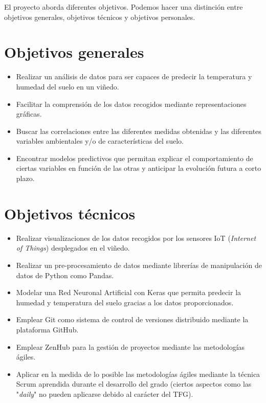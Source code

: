 
El proyecto aborda diferentes objetivos. Podemos hacer una distinción entre 
objetivos generales, objetivos técnicos y objetivos personales.

\section{Objetivos generales}
\begin{itemize}
    \item Realizar un análisis de datos para ser capaces de predecir la temperatura
        y humedad del suelo en un viñedo.
    \item Facilitar la comprensión de los datos recogidos mediante representaciones
        gráficas.
    \item Buscar las correlaciones entre las diferentes medidas obtenidas y las 
        diferentes variables ambientales y/o de características del suelo.
    \item Encontrar modelos predictivos que permitan explicar el comportamiento
        de ciertas variables en función de las otras y anticipar la evolución futura
        a corto plazo.
\end{itemize}

\section{Objetivos técnicos}
\begin{itemize}    
    \item Realizar visualizaciones de los datos recogidos por los sensores IoT 
        (\textit{Internet of Things}) desplegados en el viñedo.
    \item Realizar un pre-procesamiento de datos mediante librerías de manipulación
        de datos de Python como Pandas.
    \item Modelar una Red Neuronal Artificial con Keras que permita predecir la humedad
        y temperatura del suelo gracias a los datos proporcionados.
    \item Emplear Git como sistema de control de versiones distribuido mediante
        la plataforma GitHub.
    \item Emplear ZenHub para la gestión de proyectos mediante las metodologías 
        ágiles.
    \item Aplicar en la medida de lo posible las metodologías ágiles mediante la 
        técnica Scrum aprendida durante el desarrollo del grado (ciertos aspectos
        como las "\textit{daily}" no pueden aplicarse debido al carácter del TFG).
\end{itemize}

